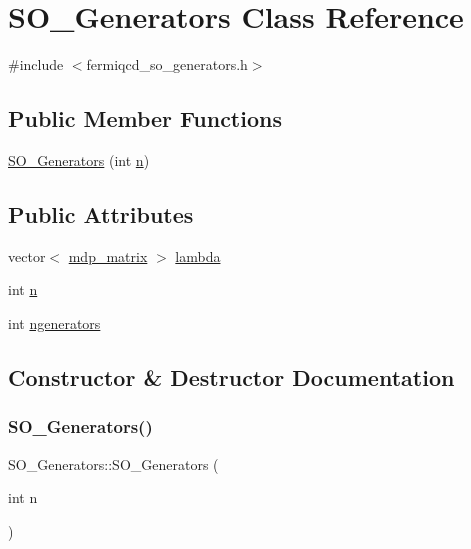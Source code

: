 \hypertarget{class_s_o___generators}{}\section{S\+O\+\_\+\+Generators Class Reference}
\label{class_s_o___generators}


{\ttfamily \#include $<$fermiqcd\+\_\+so\+\_\+generators.\+h$>$}

\subsection*{Public Member Functions}
\begin{DoxyCompactItemize}
\item 
\hyperlink{class_s_o___generators_a06b5e24ae7c0be40c11b40421cdff2ed}{S\+O\+\_\+\+Generators} (int \hyperlink{class_s_o___generators_afb2df00492fe0d24e7c862015f8e9476}{n})
\end{DoxyCompactItemize}
\subsection*{Public Attributes}
\begin{DoxyCompactItemize}
\item 
vector$<$ \hyperlink{classmdp__matrix}{mdp\+\_\+matrix} $>$ \hyperlink{class_s_o___generators_af8407ee230e86dd617df950413ce01cd}{lambda}
\item 
int \hyperlink{class_s_o___generators_afb2df00492fe0d24e7c862015f8e9476}{n}
\item 
int \hyperlink{class_s_o___generators_aa44e42d7afbb4c6585c58474616781a6}{ngenerators}
\end{DoxyCompactItemize}


\subsection{Constructor \& Destructor Documentation}
\mbox{\label{class_s_o___generators_a06b5e24ae7c0be40c11b40421cdff2ed}} 
\subsubsection{\texorpdfstring{S\+O\+\_\+\+Generators()}{SO\_Generators()}}
{\footnotesize\ttfamily S\+O\+\_\+\+Generators\+::\+S\+O\+\_\+\+Generators (\begin{DoxyParamCaption}\item[{int}]{n }\end{DoxyParamCaption})\hspace{0.3cm}{\ttfamily [inline]}}




